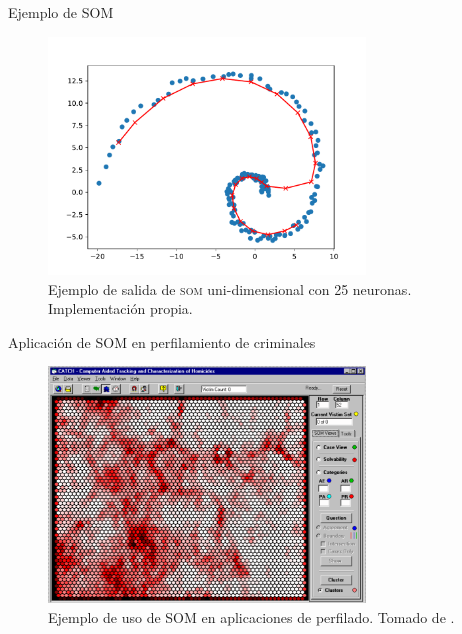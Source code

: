 \documentclass[10pt]{beamer}
\begin{document}
\begin{frame}{Ejemplo de \textsc{SOM}}
  \begin{figure}
    \centering
    \includegraphics[width=0.75\textwidth]{Images/som-implementation-example25.pdf}
    \caption[Ejemplo de salida de \textsc{som} uni-dimensional]{Ejemplo de salida de \textsc{som} uni-dimensional con 25 neuronas. Implementación propia.}
    \label{fig:som-impl-example}
  \end{figure}
\end{frame}

\begin{frame}{Aplicación de \textsc{SOM} en perfilamiento de criminales}
  \begin{figure}
    \centering
    \includegraphics[width=0.75\textwidth]{Images/som-example.png}
    \caption[Ejemplo de uso de \textsc{SOM} en aplicaciones de perfilado]{Ejemplo de uso de \textsc{SOM} en aplicaciones de perfilado. Tomado de \cite{mena2003investigative}.}
    \label{fig:som-example}
  \end{figure}
\end{frame}
\end{document}

